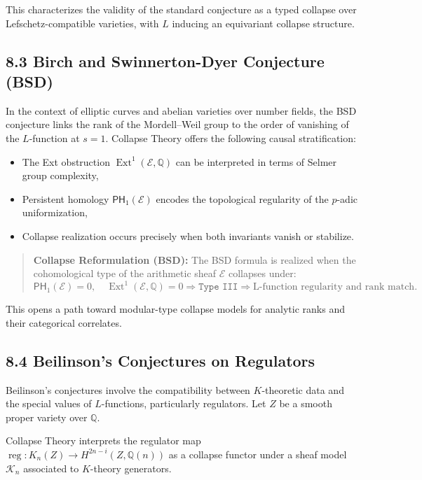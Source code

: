 \documentclass[11pt]{article}
\DeclareMathOperator{\Ext}{Ext}
\begin{document}
This characterizes the validity of the standard conjecture as a typed collapse over Lefschetz-compatible varieties, with $L$ inducing an equivariant collapse structure.

\subsection{8.3 Birch and Swinnerton-Dyer Conjecture (BSD)}

In the context of elliptic curves and abelian varieties over number fields, the BSD conjecture links the rank of the Mordell–Weil group to the order of vanishing of the $L$-function at $s = 1$. Collapse Theory offers the following causal stratification:

\begin{itemize}
  \item The Ext obstruction $\Ext^1(\mathcal{E}, \mathbb{Q})$ can be interpreted in terms of Selmer group complexity,
  \item Persistent homology $\mathsf{PH}_1(\mathcal{E})$ encodes the topological regularity of the $p$-adic uniformization,
  \item Collapse realization occurs precisely when both invariants vanish or stabilize.
\end{itemize}

\begin{quote}
\textbf{Collapse Reformulation (BSD):}  
The BSD formula is realized when the cohomological type of the arithmetic sheaf $\mathcal{E}$ collapses under:
\[
\mathsf{PH}_1(\mathcal{E}) = 0, \quad \Ext^1(\mathcal{E}, \mathbb{Q}) = 0
\Rightarrow \texttt{Type III} \Rightarrow \text{L-function regularity and rank match}.
\]
\end{quote}

This opens a path toward modular-type collapse models for analytic ranks and their categorical correlates.

\subsection{8.4 Beilinson’s Conjectures on Regulators}

Beilinson’s conjectures involve the compatibility between $K$-theoretic data and the special values of $L$-functions, particularly regulators. Let $Z$ be a smooth proper variety over $\mathbb{Q}$.

Collapse Theory interprets the regulator map $\operatorname{reg}: K_n(Z) \to H^{2n-i}(Z, \mathbb{Q}(n))$ as a collapse functor under a sheaf model $\mathcal{K}_n$ associated to $K$-theory generators.
\end{document}

